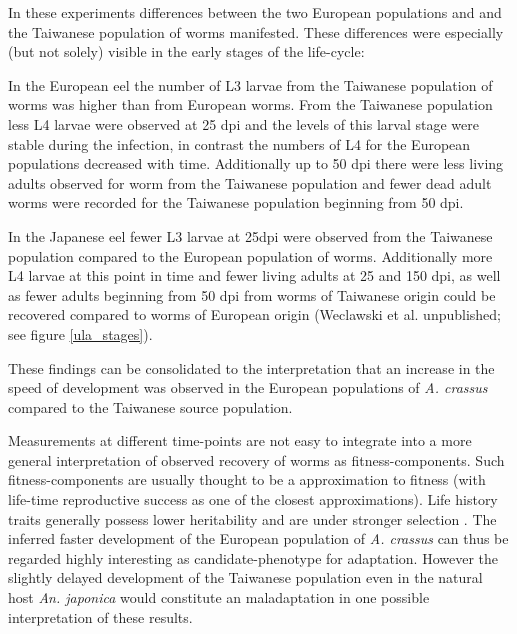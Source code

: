 In these experiments differences between the two European populations
and and the Taiwanese population of worms manifested. These
differences were especially (but not solely) visible in the early
stages of the life-cycle:

In the European eel the number of L3 larvae from the Taiwanese
population of worms was higher than from European worms. From the
Taiwanese population less L4 larvae were observed at 25 dpi and the
levels of this larval stage were stable during the infection, in
contrast the numbers of L4 for the European populations decreased with
time. Additionally up to 50 dpi there were less living adults observed
for worm from the Taiwanese population and fewer dead adult worms were
recorded for the Taiwanese population beginning from 50 dpi.

In the Japanese eel fewer L3 larvae at 25dpi were observed from the
Taiwanese population compared to the European population of
worms. Additionally more L4 larvae at this point in time and fewer
living adults at 25 and 150 dpi, as well as fewer adults beginning
from 50 dpi from worms of Taiwanese origin could be recovered compared
to worms of European origin (Weclawski et al. unpublished; see figure
\ref{ula_stages}).

These findings can be consolidated to the interpretation that an
increase in the speed of development was observed in the European
populations of \textit{A. crassus} compared to the Taiwanese source
population.

Measurements at different time-points are not easy to integrate into a
more general interpretation of observed recovery of worms as
fitness-components. Such fitness-components are usually thought to be
a approximation to fitness (with life-time reproductive success as one
of the closest approximations). Life history traits generally possess
lower heritability and are under stronger selection
\cite{pmid3316130}. The inferred faster development of the European
population of \textit{A. crassus} can thus be regarded highly
interesting as candidate-phenotype for adaptation. However the slightly
delayed development of the Taiwanese population even in the natural
host \textit{An. japonica} would constitute an maladaptation
\cite{pmid21708731} in one possible interpretation of these results.

